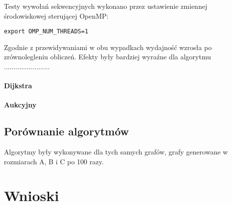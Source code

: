 \documentclass {article}
\begin{document}
Testy wywołań sekwencyjnych wykonano przez ustawienie zmiennej środowiskowej sterującej OpenMP:

\begin{verbatim}
export OMP_NUM_THREADS=1
\end{verbatim}

Zgodnie z przewidywaniami w obu wypadkach wydajność wzrosła po zrównolegleniu obliczeń. Efekty były bardziej wyraźne dla algorytmu ........................

\paragraph{Dijkstra}


\paragraph{Aukcyjny}



\subsection{Porównanie algorytmów}

Algorytmy były wykonywane dla tych samych grafów, grafy generowane w rozmiarach A, B i C po 100 razy.


\section{Wnioski}
\end{document}
